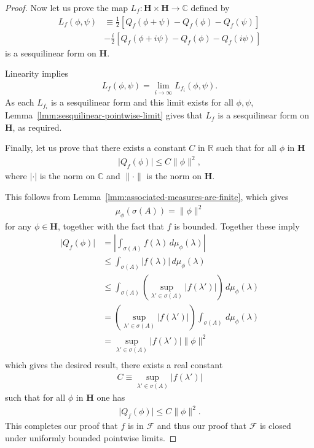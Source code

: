 \begin{proof}
Now let us prove the map $L_f : \mathbf{H} \times \mathbf{H} \rightarrow \mathbb{C}$ defined by
\begin{align}
    L_f(\phi, \psi) &\equiv \frac{1}{2} \left[ Q_f(\phi + \psi) - Q_f(\phi) - Q_f(\psi) \right] \\
                                                    &-\frac{i}{2} \left[ Q_f(\phi + i\psi) - Q_f(\phi) - Q_f(i\psi) \right]
\end{align}
is a sesquilinear form on $\mathbf{H}$.

Linearity implies
\begin{align}
    L_f(\phi, \psi) = \lim\limits_{i \rightarrow \infty} L_{f_i}(\phi, \psi).
\end{align}
As each $L_{f_i}$ is a sesquilinear form and this limit exists for all $\phi,\psi$, Lemma~\ref{lmm:sesquilinear-pointwise-limit} gives that $L_f$ is a sesquilinear form on $\mathbf{H}$, as required.

Finally, let us prove that there exists a constant $C$ in $\mathbb{R}$ such that for all $\phi$ in $\mathbf{H}$
\begin{align}
    \lvert Q_f(\phi) \rvert \le C \|\phi\|^2,
\end{align}
where $\lvert \cdot \rvert$ is the norm on $\mathbb{C}$ and $\|\cdot\|$ is the norm on $\mathbf{H}$. 

This follows from Lemma~\ref{lmm:associated-measures-are-finite}, which gives
\begin{align}
    \mu_\phi(\sigma(A)) = \|\phi\|^2
\end{align}
for any $\phi \in \mathbf{H}$, together with the fact that $f$ is bounded. Together these imply
\begin{align}
    \lvert Q_f(\phi) \rvert &=   \left\lvert \int_{\sigma(A)} f(\lambda) \, d\mu_\phi(\lambda) \right\rvert \\
                            &\le \int_{\sigma(A)} \left\lvert f(\lambda) \right\rvert \, d\mu_\phi(\lambda) \\
                            &\le \int_{\sigma(A)} \left( \sup\limits_{\lambda' \in \sigma(A)} \left\lvert f(\lambda') \right\rvert \right) \, d\mu_\phi(\lambda) \\
                            &=   \left( \sup\limits_{\lambda' \in \sigma(A)} \left\lvert f(\lambda') \right\rvert \right) \int_{\sigma(A)} \, d\mu_\phi(\lambda) \\
                            &=   \sup\limits_{\lambda' \in \sigma(A)} \left\lvert f(\lambda') \right\rvert \|\phi\|^2 \\
\end{align}
which gives the desired result, there exists a real constant
\begin{align}
    C \equiv \sup\limits_{\lambda' \in \sigma(A)} \left\lvert f(\lambda') \right\rvert
\end{align}
such that for all $\phi$ in $\mathbf{H}$ one has
\begin{align}
    \lvert Q_f(\phi) \rvert \le C \|\phi\|^2.
\end{align}
This completes our proof that $f$ is in $\mathcal{F}$ and thus our proof that $\mathcal{F}$ is closed under uniformly bounded pointwise limits.


\end{proof}
